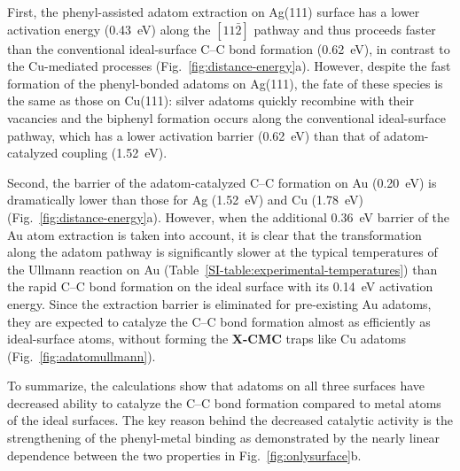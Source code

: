 \documentclass[aps,prb,amsmath,amssymb,11pt]{revtex4-1}
\begin{document}
First, the phenyl-assisted adatom extraction on Ag(111) surface has a lower activation energy (\SI{0.43}{\electronvolt}) along the $[11\bar{2}]$ pathway and thus proceeds faster than the conventional ideal-surface C--C bond formation (\SI{0.62}{\electronvolt}), in contrast to the Cu-mediated processes (Fig.~\ref{fig:distance-energy}a). However, despite the fast formation of the phenyl-bonded adatoms on Ag(111), the fate of these species is the same as those on Cu(111): silver adatoms quickly recombine with their vacancies and the biphenyl formation occurs along the conventional ideal-surface pathway, which has a lower activation barrier (\SI{0.62}{\electronvolt}) than that of adatom-catalyzed coupling (\SI{1.52}{\electronvolt}).

Second, the barrier of the adatom-catalyzed C--C formation on Au (\SI{0.20}{\electronvolt}) is dramatically lower than those for Ag (\SI{1.52}{\electronvolt}) and Cu (\SI{1.78}{\electronvolt})  (Fig.~\ref{fig:distance-energy}a). 
However, when the additional \SI{0.36}{\electronvolt} barrier of the Au atom extraction is taken into account, it is clear that
the transformation along the adatom pathway is significantly slower at the typical temperatures of the Ullmann reaction on Au (Table~\ref{SI-table:experimental-temperatures}) than the rapid C--C bond formation on the ideal surface with its \SI{0.14}{\electronvolt} activation energy. 
Since the extraction barrier is eliminated for pre-existing Au adatoms, they are expected to catalyze the C--C bond formation almost as efficiently as ideal-surface atoms, without forming the \textbf{X-CMC} traps like Cu adatoms~\cite{ullmann_65} (Fig.~\ref{fig:adatomullmann}).

To summarize, the calculations show that adatoms on all three surfaces have decreased ability to catalyze the C--C bond formation compared to metal atoms of the ideal surfaces. 
The key reason behind the decreased catalytic activity is the strengthening of the phenyl-metal binding as demonstrated by the nearly linear dependence between the two properties in Fig.~\ref{fig:onlysurface}b.
\end{document}
